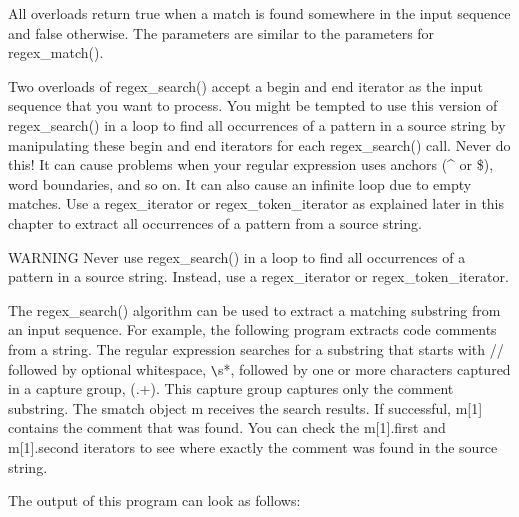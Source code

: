 All overloads return true when a match is found somewhere in the input sequence and false otherwise. The parameters are similar to the parameters for regex\_match().

Two overloads of regex\_search() accept a begin and end iterator as the input sequence that you want to process. You might be tempted to use this version of regex\_search() in a loop to find all occurrences of a pattern in a source string by manipulating these begin and end iterators for each regex\_search() call. Never do this! It can cause problems when your regular expression uses anchors (\^{} or \$), word boundaries, and so on. It can also cause an infinite loop due to empty matches. Use a regex\_iterator or regex\_token\_iterator as explained later in this chapter to extract all occurrences of a pattern from a source string.

\begin{myWarning}{WARNING}
Never use regex\_search() in a loop to find all occurrences of a pattern in a source string. Instead, use a regex\_iterator or regex\_token\_iterator.
\end{myWarning}


The regex\_search() algorithm can be used to extract a matching substring from an input sequence. For example, the following program extracts code comments from a string. The regular expression searches for a substring that starts with // followed by optional whitespace, \verb|\|s*, followed by one or more characters captured in a capture group, (.+). This capture group captures only the comment substring. The smatch object m receives the search results. If successful, m[1] contains the comment that was found. You can check the m[1].first and m[1].second iterators to see where exactly the comment was found in the source string.


The output of this program can look as follows:

